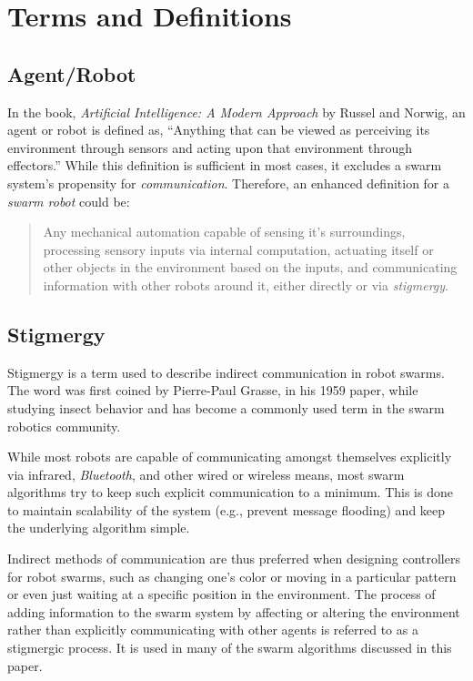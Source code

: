 \documentclass[Main.tex]{subfiles}
\begin{document}
\section{Terms and Definitions}
\subsection{Agent/Robot}
In the book, \emph{Artificial Intelligence: A Modern Approach} by Russel and Norwig\cite{Russel1995}, an agent or robot is defined as, ``Anything that can be viewed as perceiving its environment through sensors and acting upon that environment through effectors.'' While this definition is sufficient in most cases, it excludes a swarm system's propensity for \emph{communication}. Therefore, an enhanced definition for a \emph{swarm robot} could be: 
\begin{quote}
Any mechanical automation capable of sensing it's surroundings, processing sensory inputs via internal computation, actuating itself or other objects in the environment based on the inputs, and communicating information with other robots around it, either directly or via \emph{stigmergy}.
\end{quote}


\subsection{Stigmergy}
Stigmergy is a term used to describe indirect communication in robot swarms. The word was first coined by Pierre-Paul Grasse, in his 1959 paper\cite{Grasse1959}, while studying insect behavior and has become a commonly used term in the swarm robotics community. 

While most robots are capable of communicating amongst themselves explicitly via infrared, \emph{Bluetooth}\texttrademark, and other wired or wireless means, most swarm algorithms try to keep such explicit communication to a minimum. This is done to maintain scalability of the system (e.g., prevent message flooding) and keep the underlying algorithm simple.

Indirect methods of communication are thus preferred when designing controllers for robot swarms, such as changing one's color or moving in a particular pattern or even just waiting at a specific position in the environment. The process of adding information to the swarm system by affecting or altering the environment rather than explicitly communicating with other agents is referred to as a stigmergic process\cite{Balch2005}. It is used in many of the swarm algorithms discussed in this paper.
\end{document}
